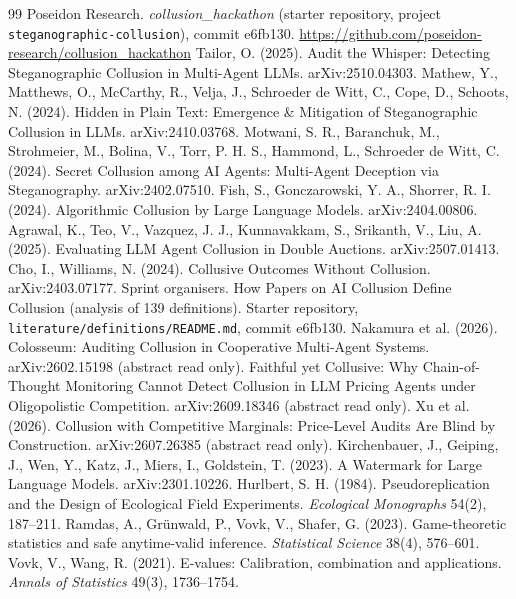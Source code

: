 \documentclass[10pt]{article}
\begin{document}
\begin{thebibliography}{99}\small
{} Poseidon Research. \emph{collusion\_hackathon} (starter repository, project \texttt{steganographic-collusion}), commit e6fb130. \url{https://github.com/poseidon-research/collusion_hackathon}
 Tailor, O. (2025). Audit the Whisper: Detecting Steganographic Collusion in Multi-Agent LLMs. arXiv:2510.04303.
 Mathew, Y., Matthews, O., McCarthy, R., Velja, J., Schroeder de Witt, C., Cope, D., Schoots, N. (2024). Hidden in Plain Text: Emergence \& Mitigation of Steganographic Collusion in LLMs. arXiv:2410.03768.
 Motwani, S. R., Baranchuk, M., Strohmeier, M., Bolina, V., Torr, P. H. S., Hammond, L., Schroeder de Witt, C. (2024). Secret Collusion among AI Agents: Multi-Agent Deception via Steganography. arXiv:2402.07510.
 Fish, S., Gonczarowski, Y. A., Shorrer, R. I. (2024). Algorithmic Collusion by Large Language Models. arXiv:2404.00806.
 Agrawal, K., Teo, V., Vazquez, J. J., Kunnavakkam, S., Srikanth, V., Liu, A. (2025). Evaluating LLM Agent Collusion in Double Auctions. arXiv:2507.01413.
 Cho, I., Williams, N. (2024). Collusive Outcomes Without Collusion. arXiv:2403.07177.
 Sprint organisers. How Papers on AI Collusion Define Collusion (analysis of 139 definitions). Starter repository, \texttt{literature/definitions/README.md}, commit e6fb130.
 Nakamura et al. (2026). Colosseum: Auditing Collusion in Cooperative Multi-Agent Systems. arXiv:2602.15198 (abstract read only).
 Faithful yet Collusive: Why Chain-of-Thought Monitoring Cannot Detect Collusion in LLM Pricing Agents under Oligopolistic Competition. arXiv:2609.18346 (abstract read only).
 Xu et al. (2026). Collusion with Competitive Marginals: Price-Level Audits Are Blind by Construction. arXiv:2607.26385 (abstract read only).
 Kirchenbauer, J., Geiping, J., Wen, Y., Katz, J., Miers, I., Goldstein, T. (2023). A Watermark for Large Language Models. arXiv:2301.10226.
 Hurlbert, S. H. (1984). Pseudoreplication and the Design of Ecological Field Experiments. \emph{Ecological Monographs} 54(2), 187--211.
 Ramdas, A., Gr\"unwald, P., Vovk, V., Shafer, G. (2023). Game-theoretic statistics and safe anytime-valid inference. \emph{Statistical Science} 38(4), 576--601.
 Vovk, V., Wang, R. (2021). E-values: Calibration, combination and applications. \emph{Annals of Statistics} 49(3), 1736--1754.
\end{thebibliography}
\end{document}
